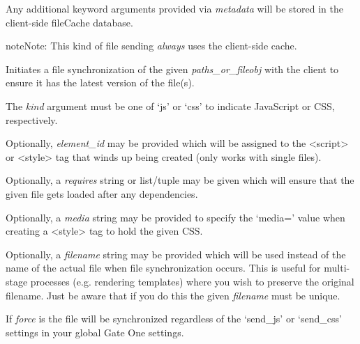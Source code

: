 \documentclass[letterpaper,10pt,openany]{sphinxmanual}
\begin{document}
\begin{fulllineitems}
\begin{fulllineitems}
Any additional keyword arguments provided via \emph{metadata} will be
stored in the client-side fileCache database.

\begin{notice}{note}{Note:}
This kind of file sending \emph{always} uses the client-side cache.
\end{notice}

\end{fulllineitems}


\begin{fulllineitems}
\label{Developer/server:gateone.core.server.ApplicationWebSocket.send_js_or_css}
Initiates a file synchronization of the given \emph{paths\_or\_fileobj} with
the client to ensure it has the latest version of the file(s).

The \emph{kind} argument must be one of `js' or `css' to indicate JavaScript
or CSS, respectively.

Optionally, \emph{element\_id} may be provided which will be assigned to the
\textless{}script\textgreater{} or \textless{}style\textgreater{} tag that winds up being created (only works with
single files).

Optionally, a \emph{requires} string or list/tuple may be given which will
ensure that the given file gets loaded after any dependencies.

Optionally, a \emph{media} string may be provided to specify the `media='
value when creating a \textless{}style\textgreater{} tag to hold the given CSS.

Optionally, a \emph{filename} string may be provided which will be used
instead of the name of the actual file when file synchronization occurs.
This is useful for multi-stage processes (e.g. rendering templates)
where you wish to preserve the original filename.  Just be aware that
if you do this the given \emph{filename} must be unique.

If \emph{force} is  the file will be synchronized regardless of the
`send\_js' or `send\_css' settings in your global Gate One settings.

\end{fulllineitems}



\end{fulllineitems}
\end{document}
